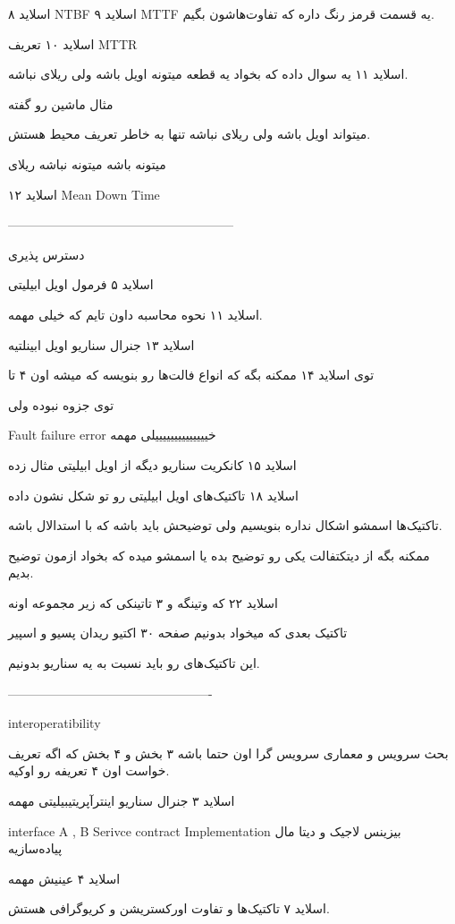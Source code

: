 اسلاید ۸ NTBF اسلاید ۹ MTTF یه قسمت قرمز رنگ داره که تفاوت‌هاشون بگیم.

اسلاید ۱۰ تعریف MTTR

اسلاید ۱۱ یه سوال داده که بخواد یه قطعه میتونه اویل باشه ولی ریلای نباشه.

مثال ماشین رو گفته

میتواند اویل باشه ولی ریلای نباشه تنها به خاطر تعریف محیط هستش.

میتونه باشه میتونه نباشه ریلای

اسلاید ۱۲ Mean Down Time

------------------------------------------------------

دسترس پذیری

اسلاید ۵ فرمول اویل ابیلیتی

اسلاید ۱۱ نحوه محاسبه داون تایم که خیلی مهمه.

اسلاید ۱۳ جنرال سناریو اویل ابینلتیه

توی اسلاید ۱۴ ممکنه بگه که انواع فالت‌ها رو بنویسه که میشه اون ۴ تا

توی جزوه نبوده ولی 

Fault failure error خییییییییییییییلی مهمه

اسلاید ۱۵ کانکریت سناریو دیگه از اویل ابیلیتی مثال زده

اسلاید ۱۸ تاکتیک‌های اویل ابیلیتی رو تو شکل نشون داده

تاکتیک‌ها اسمشو اشکال نداره بنویسیم ولی توضیحش باید باشه که با استدالال باشه.

ممکنه بگه از دیتکتفالت یکی رو توضیح بده یا اسمشو میده که بخواد ازمون توضیح بدیم.

اسلاید ۲۲ که وتینگه و ۳ تاتینکی که زیر مجموعه اونه

تاکتیک بعدی که میخواد بدونیم صفحه ۳۰ اکتیو ریدان پسیو و اسپیر

این تاکتیک‌های رو باید نسبت به یه سناریو بدونیم.

-------------------------------------------------

interoperatibility

بحث سرویس و معماری سرویس گرا اون حتما باشه ۳ بخش و ۴ بخش که اگه تعریف خواست اون
۴ تعریفه رو اوکیه.

اسلاید ۳ جنرال سناریو اینترآپریتیبیلیتی مهمه

interface A , B  Serivce contract Implementation
بیزینس لاجیک و دیتا مال پیاده‌سازیه

اسلاید ۴ عینیش مهمه

اسلاید ۷ تاکتیک‌ها و تفاوت اورکستریشن و کریوگرافی هستش.

